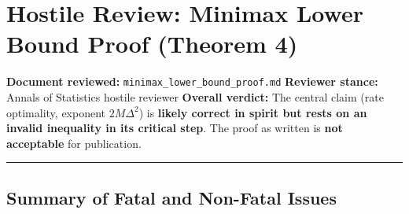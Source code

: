 \documentclass[
  12pt,
]{ctexart}
\author{SCX}
\date{2026}
\begin{document}
\section{Hostile Review: Minimax Lower Bound Proof (Theorem
4)}\label{hostile-review-minimax-lower-bound-proof-theorem-4}

\textbf{Document reviewed:} \texttt{minimax\_lower\_bound\_proof.md}
\textbf{Reviewer stance:} Annals of Statistics hostile reviewer
\textbf{Overall verdict:} The central claim (rate optimality, exponent
\(2M\Delta^2\)) is \textbf{likely correct in spirit but rests on an
invalid inequality in its critical step}. The proof as written is
\textbf{not acceptable} for publication.

\begin{center}\rule{0.5\linewidth}{0.5pt}\end{center}

\subsection{Summary of Fatal and Non-Fatal
Issues}\label{summary-of-fatal-and-non-fatal-issues}
\end{document}

